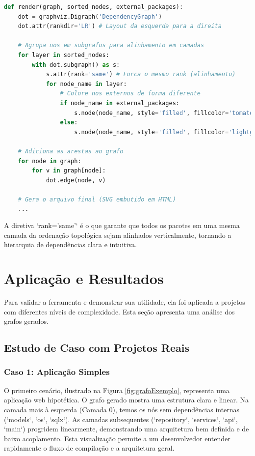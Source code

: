 \documentclass[12pt]{article}
\begin{document}
\begin{lstlisting}[language=Python, caption={Trecho do código de renderização do grafo.}, label={lst:render}]
def render(graph, sorted_nodes, external_packages):
    dot = graphviz.Digraph('DependencyGraph')
    dot.attr(rankdir='LR') # Layout da esquerda para a direita

    # Agrupa nos em subgrafos para alinhamento em camadas
    for layer in sorted_nodes:
        with dot.subgraph() as s:
            s.attr(rank='same') # Forca o mesmo rank (alinhamento)
            for node_name in layer:
                # Colore nos externos de forma diferente
                if node_name in external_packages:
                    s.node(node_name, style='filled', fillcolor='tomato')
                else:
                    s.node(node_name, style='filled', fillcolor='lightgrey')

    # Adiciona as arestas ao grafo
    for node in graph:
        for v in graph[node]:
            dot.edge(node, v)

    # Gera o arquivo final (SVG embutido em HTML)
    ...
\end{lstlisting}

A diretiva `rank='same'` é o que garante que todos os pacotes em uma mesma camada da ordenação topológica sejam alinhados verticalmente, tornando a hierarquia de dependências clara e intuitiva.

\section{Aplicação e Resultados}
Para validar a ferramenta e demonstrar sua utilidade, ela foi aplicada a projetos com diferentes níveis de complexidade. Esta seção apresenta uma análise dos grafos gerados.

\subsection{Estudo de Caso com Projetos Reais}

\subsubsection{Caso 1: Aplicação Simples}
O primeiro cenário, ilustrado na Figura \ref{fig:grafoExemplo}, representa uma aplicação web hipotética. O grafo gerado mostra uma estrutura clara e linear. Na camada mais à esquerda (Camada 0), temos os nós sem dependências internas (`models`, `os`, `sqlx`). As camadas subsequentes (`repository`, `services`, `api`, `main`) progridem linearmente, demonstrando uma arquitetura bem definida e de baixo acoplamento. Esta visualização permite a um desenvolvedor entender rapidamente o fluxo de compilação e a arquitetura geral.
\end{document}
